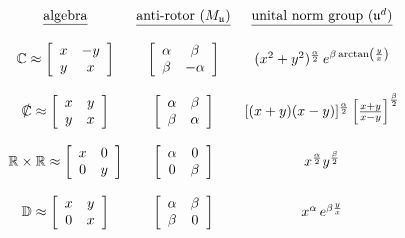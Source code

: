 \documentclass{amsart}
\numberwithin{equation}{section}
\theoremstyle{definition}
\numberwithin{theorem}{section}
\begin{document}
\vspace{.25cm}


\hspace{.7cm}$ \begin{array}{cccccccc} 
\mbox{\underline{algebra}} & \mbox{\underline{anti-rotor $(M_{\mathfrak{u}})$}} & \mbox{\underline{unital norm group ($\mathfrak{u}^d$)}}  \\ 
\\
\mathbb{C} \approx \left[\begin{array}{ccc}
x  & -y    \\
 y & x \\   
\end{array}\right]   & \left[\begin{array}{ccc}
\alpha  & \beta    \\
 \beta & -\alpha \\   
\end{array}\right]  & (x^2+y^2)^{\frac{\alpha}{2}} \,e^{\beta\,{\rm arctan}\left(\frac{y}{x}\right)}  \\ \\
\slashed{\mathbb{C}} \approx \left[\begin{array}{ccc}
x  & y    \\
 y & x \\   
\end{array}\right]   & \left[\begin{array}{ccc}
\alpha  & \beta    \\
 \beta & \alpha \\   
\end{array}\right]  & [(x+y)(x-y)]^{\frac{\alpha}{2}} \left[\frac{x+y}{x-y}\right]^{\frac{\beta}{2}}  \\ \\ 
\mathbb{R}\times\mathbb{R} \approx \left[\begin{array}{ccc}
x  & 0    \\
 0 & y \\   
\end{array}\right]   & \left[\begin{array}{ccc}
\alpha  & 0    \\
 0 & \beta \\   
\end{array}\right]  & x^\frac{\alpha}{2} y^\frac{\beta}{2}  \\ \\
\mathbb{D} \approx \left[\begin{array}{ccc}
x  & y    \\
 0 & x \\   
\end{array}\right]   & \left[\begin{array}{ccc}
\alpha  & \beta    \\
 \beta & 0 \\   
\end{array}\right]  & x^\alpha\,e^{\beta \frac{y}{x}}  \\ \\
\end{array} $
\end{document}
